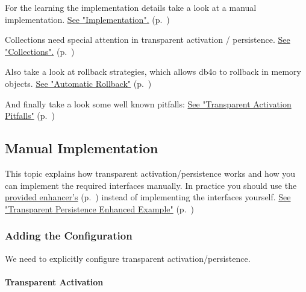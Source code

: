 For the learning the implementation details take a look at a manual implementation. \hyperref[ref:basics-transparentpersistence-implementation]{See "Implementation".} (p.~\pageref{ref:basics-transparentpersistence-implementation})

Collections need special attention in transparent activation / persistence. \hyperref[ref:basics-transparentpersistence-collections]{See "Collections".} (p.~\pageref{ref:basics-transparentpersistence-collections})

Also take a look at rollback strategies, which allows db4o to rollback in memory objects. \hyperref[ref:basics-transparentpersistence-automatic-deactivation]{See "Automatic Rollback"} (p.~\pageref{ref:basics-transparentpersistence-automatic-deactivation})

And finally take a look some well known pitfalls: \hyperref[ref:basics-transparentpersistence-transparent-activation-pitfalls]{See "Transparent Activation Pitfalls"} (p.~\pageref{ref:basics-transparentpersistence-transparent-activation-pitfalls})

\subsection{Manual Implementation}
\label{ref:basics-transparentpersistence-implementation}

This topic explains how transparent activation/persistence works and how you can implement the required interfaces manually. In practice you should use the \hyperref[ref:advanced-topics-enhancement-tools]{provided enhancer's} (p.~\pageref{ref:advanced-topics-enhancement-tools}) instead of implementing the interfaces yourself. \hyperref[ref:basics-transparentpersistence-ta-enhanced-example]{See "Transparent Persistence Enhanced Example"} (p.~\pageref{ref:basics-transparentpersistence-ta-enhanced-example})

\subsubsection{Adding the Configuration}
\label{ref:basics-transparentpersistence-implementation:adding}

We need to explicitly configure transparent activation/persistence.

\paragraph*{Transparent Activation}

